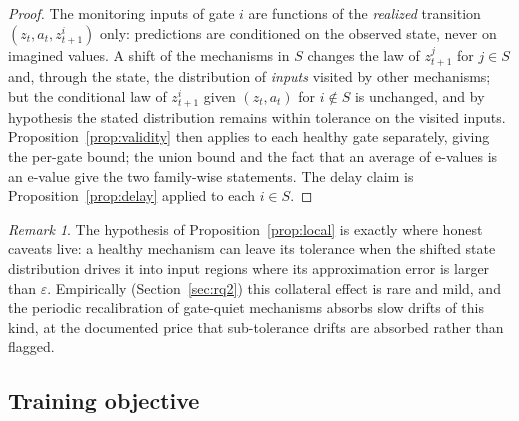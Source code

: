 \documentclass[preprint,12pt]{elsarticle}
\theoremstyle{definition}
\theoremstyle{remark}
\newtheorem{remark}{Remark}
\begin{document}
\begin{proof}
The monitoring inputs of gate $i$ are functions of the \emph{realized}
transition $(z_t,a_t,z^i_{t+1})$ only: predictions are conditioned on the
observed state, never on imagined values. A shift of the mechanisms in
$S$ changes the law of $z^j_{t+1}$ for $j\in S$ and, through the state,
the distribution of \emph{inputs} visited by other mechanisms; but the
conditional law of $z^i_{t+1}$ given $(z_t,a_t)$ for $i\notin S$ is
unchanged, and by hypothesis the stated distribution remains within
tolerance on the visited inputs. Proposition~\ref{prop:validity} then
applies to each healthy gate separately, giving the per-gate bound; the
union bound and the fact that an average of e-values is an e-value give
the two family-wise statements. The delay claim is
Proposition~\ref{prop:delay} applied to each $i\in S$.
\end{proof}

\begin{remark}
The hypothesis of Proposition~\ref{prop:local} is exactly where honest
caveats live: a healthy mechanism can leave its tolerance when the
shifted state distribution drives it into input regions where its
approximation error is larger than $\varepsilon$. Empirically
(Section~\ref{sec:rq2}) this collateral effect is rare and mild, and the
periodic recalibration of gate-quiet mechanisms absorbs slow drifts of
this kind, at the documented price that sub-tolerance drifts are
absorbed rather than flagged.
\end{remark}

\subsection{Training objective}\label{sec:training}
\end{document}
